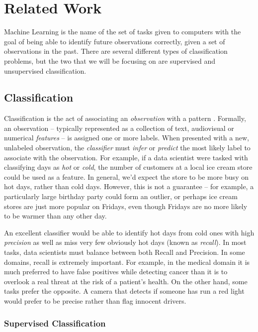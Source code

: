 \chapter{Related Work}\label{sec:related}

Machine Learning is the name of the set of tasks given to computers with the goal of being able to identify future observations correctly, given a set of observations in the past. There are several different types of classification problems, but the two that we will be focusing on are supervised and unsupervised classification. 

\section{Classification}

Classification is the act of associating an \textit{observation} with a pattern \cite{liu2007web}. Formally, an observation -- typically represented as a collection of text, audiovisual or numerical \textit{features} -- is assigned one or more labels. When presented with a new, unlabeled observation, the \textit{classifier} must \textit{infer} or \textit{predict} the most likely label to associate with the observation. For example, if a data scientist were tasked with classifying days as \textit{hot} or \textit{cold}, the number of customers at a local ice cream store could be used as a feature. In general, we'd expect the store to be more busy on hot days, rather than cold days. However, this is not a guarantee -- for example, a particularly large birthday party could form an outlier, or perhaps ice cream stores are just more popular on Fridays, even though Fridays are no more likely to be warmer than any other day.

An excellent classifier would be able to identify hot days from cold ones with high \textit{precision} as well as miss very few obviously hot days (known as \textit{recall}). In most tasks, data scientists must balance between both Recall and Precision. In some domains, recall is extremely important. For example, in the medical domain it is much preferred to have false positives while detecting cancer than it is to overlook a real threat at the risk of a patient's health.  On the other hand, some tasks prefer the opposite. A camera that detects if someone has run a red light would prefer to be precise rather than flag innocent drivers.

\subsection{Supervised Classification}

